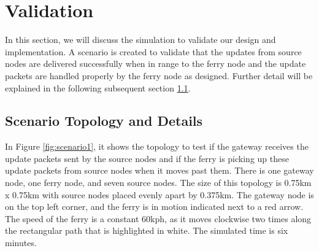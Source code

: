 %

\section{Validation} %

In this section, we will discuss the simulation to validate our design and implementation. 
A scenario is created to validate that the updates from source nodes are delivered successfully when in range to the ferry node and the update packets are handled properly by the ferry node as designed.   
Further detail will be explained in the following subsequent section \ref{sec:scenario1}. %



\subsection{Scenario Topology  and Details}
\label{sec:scenario1}


In Figure \ref{fig:scenario1}, it shows the topology to test if the gateway receives the update packets sent by the source nodes and if the ferry is picking up these update packets from source nodes when it moves past them.
There is one gateway node, one ferry node, and seven source nodes. 
The size of this topology is 0.75km x 0.75km with source nodes placed evenly apart by 0.375km. 
The gateway node is on the top left corner, and the ferry is in motion indicated next to a red arrow.
The speed of the ferry is a constant 60kph, as it moves clockwise two times along the rectangular path that is highlighted in white.  The simulated time is six minutes.

